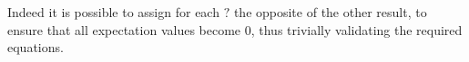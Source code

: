 \documentclass[english,reprint, aps, prl,superscriptaddress, showpacs,
showkeys, longbibliography, amsmath, amssymb, floatfix]{revtex4-1}
\theoremstyle{plain}
\theoremstyle{definition}
\newcommand{\missing}{?}
\begin{document}

\noindent Indeed it is possible to assign for each $?$ the opposite of
the other result, to ensure that all expectation values become 0, thus
trivially validating the required equations. 

\end{document}
